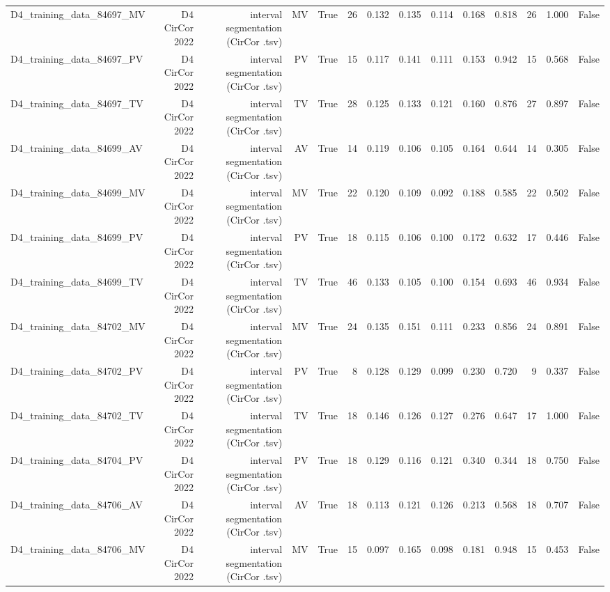 \begin{table}[htbp]
\begin{tabular}{lrrrrrrrrrrrrr}
    D4\_training\_data\_84697\_MV & D4 CirCor 2022 & interval segmentation (CirCor .tsv) & MV & True & 26 & 0.132 & 0.135 & 0.114 & 0.168 & 0.818 & 26 & 1.000 & False \\
    D4\_training\_data\_84697\_PV & D4 CirCor 2022 & interval segmentation (CirCor .tsv) & PV & True & 15 & 0.117 & 0.141 & 0.111 & 0.153 & 0.942 & 15 & 0.568 & False \\
    D4\_training\_data\_84697\_TV & D4 CirCor 2022 & interval segmentation (CirCor .tsv) & TV & True & 28 & 0.125 & 0.133 & 0.121 & 0.160 & 0.876 & 27 & 0.897 & False \\
    D4\_training\_data\_84699\_AV & D4 CirCor 2022 & interval segmentation (CirCor .tsv) & AV & True & 14 & 0.119 & 0.106 & 0.105 & 0.164 & 0.644 & 14 & 0.305 & False \\
    D4\_training\_data\_84699\_MV & D4 CirCor 2022 & interval segmentation (CirCor .tsv) & MV & True & 22 & 0.120 & 0.109 & 0.092 & 0.188 & 0.585 & 22 & 0.502 & False \\
    D4\_training\_data\_84699\_PV & D4 CirCor 2022 & interval segmentation (CirCor .tsv) & PV & True & 18 & 0.115 & 0.106 & 0.100 & 0.172 & 0.632 & 17 & 0.446 & False \\
    D4\_training\_data\_84699\_TV & D4 CirCor 2022 & interval segmentation (CirCor .tsv) & TV & True & 46 & 0.133 & 0.105 & 0.100 & 0.154 & 0.693 & 46 & 0.934 & False \\
    D4\_training\_data\_84702\_MV & D4 CirCor 2022 & interval segmentation (CirCor .tsv) & MV & True & 24 & 0.135 & 0.151 & 0.111 & 0.233 & 0.856 & 24 & 0.891 & False \\
    D4\_training\_data\_84702\_PV & D4 CirCor 2022 & interval segmentation (CirCor .tsv) & PV & True & 8 & 0.128 & 0.129 & 0.099 & 0.230 & 0.720 & 9 & 0.337 & False \\
    D4\_training\_data\_84702\_TV & D4 CirCor 2022 & interval segmentation (CirCor .tsv) & TV & True & 18 & 0.146 & 0.126 & 0.127 & 0.276 & 0.647 & 17 & 1.000 & False \\
    D4\_training\_data\_84704\_PV & D4 CirCor 2022 & interval segmentation (CirCor .tsv) & PV & True & 18 & 0.129 & 0.116 & 0.121 & 0.340 & 0.344 & 18 & 0.750 & False \\
    D4\_training\_data\_84706\_AV & D4 CirCor 2022 & interval segmentation (CirCor .tsv) & AV & True & 18 & 0.113 & 0.121 & 0.126 & 0.213 & 0.568 & 18 & 0.707 & False \\
    D4\_training\_data\_84706\_MV & D4 CirCor 2022 & interval segmentation (CirCor .tsv) & MV & True & 15 & 0.097 & 0.165 & 0.098 & 0.181 & 0.948 & 15 & 0.453 & False \\

\end{tabular}
\end{table}
